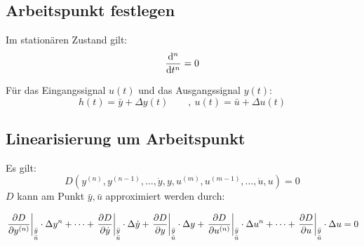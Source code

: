 \subsection{Arbeitspunkt festlegen}

Im stationären Zustand gilt:
\[
	\frac{\mathrm{d} ^n}{\mathrm{d} t^n} = 0
\]

Für das Eingangssignal $u(t)$ und das Ausgangssignal $y(t)$:
\[
	h(t) = \bar{y} + \Delta y(t) \qquad ,\ u(t) = \bar{u} + \Delta u(t)
\]


\subsection{Linearisierung um Arbeitspunkt}
Es gilt:
\[
	D(y^{(n)}, y^{(n-1)}, \dots ,\dot{y} ,y, u^{(m)}, u^{(m-1)}, \dots , \dot{u} ,u)= 0
\]
$D$ kann am Punkt $\bar{y}, \bar{u}$ approximiert werden durch:
\begin{small}
\[
	\left.\pdifrac{D}{y^{(n)}}\right|_{\begin{scriptsize}\begin{matrix} \bar{y} \\ \bar{u} \end{matrix}\end{scriptsize}} \cdot \Delta y^{n} + \dots +
	\left.\pdifrac{D}{\dot{y}}\right|_{\begin{scriptsize}\begin{matrix} \bar{y} \\ \bar{u} \end{matrix}\end{scriptsize}} \cdot \Delta \dot{y} +
	\left.\pdifrac{D}{y}\right|_{\begin{scriptsize}\begin{matrix} \bar{y} \\ \bar{u} \end{matrix}\end{scriptsize}} \cdot \Delta y +
	\left.\pdifrac{D}{u^{(n)}}\right|_{\begin{scriptsize}\begin{matrix} \bar{y} \\ \bar{u} \end{matrix}\end{scriptsize}} \cdot \Delta u^{n} + \dots +
	\left.\pdifrac{D}{u}\right|_{\begin{scriptsize}\begin{matrix} \bar{y} \\ \bar{u} \end{matrix}\end{scriptsize}} \cdot \Delta u = 0
\]
\end{small}

